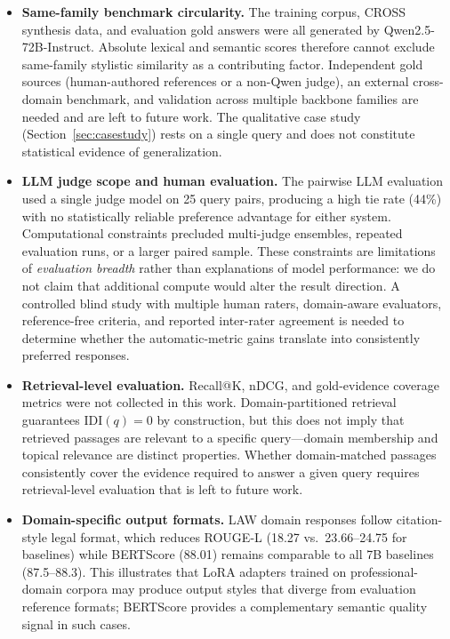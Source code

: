 \documentclass[a4paper,fleql,doubleblind]{cas-sc}
\begin{document}
\begin{itemize}
\item \textbf{Same-family benchmark circularity.}
The training corpus, CROSS synthesis data, and evaluation gold answers were
all generated by Qwen2.5-72B-Instruct. Absolute lexical and semantic scores
therefore cannot exclude same-family stylistic similarity as a contributing
factor. Independent gold sources (human-authored references or a non-Qwen
judge), an external cross-domain benchmark, and validation across multiple
backbone families are needed and are left to future work. The qualitative
case study (Section~\ref{sec:casestudy})
rests on a single query and does not constitute statistical evidence of
generalization.

\item \textbf{LLM judge scope and human evaluation.}
The pairwise LLM evaluation used a single judge model on 25 query pairs,
producing a high tie rate (44\%) with no statistically reliable preference
advantage for either system.
Computational constraints precluded multi-judge ensembles, repeated evaluation
runs, or a larger paired sample.
These constraints are limitations of \emph{evaluation breadth} rather than
explanations of model performance: we do not claim that additional compute
would alter the result direction.
A controlled blind study with multiple human raters, domain-aware evaluators,
reference-free criteria, and reported inter-rater agreement is needed to
determine whether the automatic-metric gains translate into consistently
preferred responses.

\item \textbf{Retrieval-level evaluation.}
Recall@K, nDCG, and gold-evidence coverage metrics were not collected in this
work. Domain-partitioned retrieval guarantees $\mathrm{IDI}(q){=}0$ by
construction, but this does not imply that retrieved passages are relevant to
a specific query---domain membership and topical relevance are distinct
properties. Whether domain-matched passages consistently cover the evidence
required to answer a given query requires retrieval-level evaluation that is
left to future work.

\item \textbf{Domain-specific output formats.}
LAW domain responses follow citation-style legal format, which reduces ROUGE-L
(18.27 vs.\ 23.66--24.75 for baselines) while BERTScore (88.01) remains
comparable to all 7B baselines (87.5--88.3).
This illustrates that LoRA adapters trained on professional-domain corpora may
produce output styles that diverge from evaluation reference formats;
BERTScore provides a complementary semantic quality signal in such cases.


\end{itemize}
\end{document}

